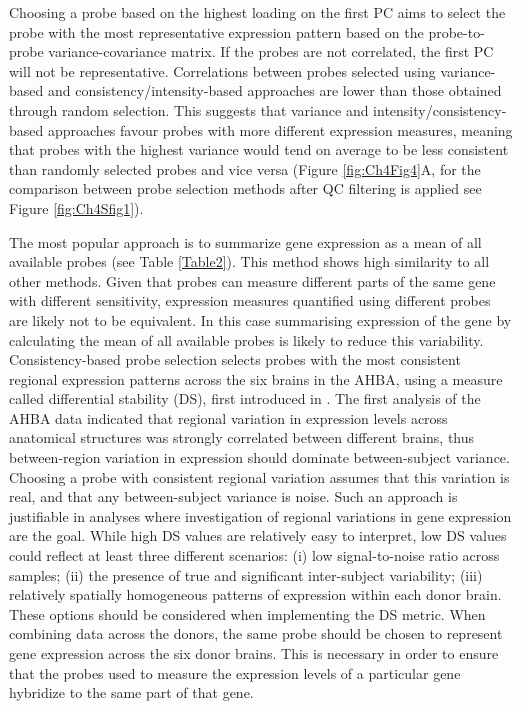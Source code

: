 \documentclass[10pt,A4]{article}
\begin{document}
Choosing a probe based on the highest loading on the first PC aims to select the probe with the most representative expression pattern based on the probe-to-probe variance-covariance matrix. If the probes are not correlated, the first PC will not be representative. Correlations between probes selected using variance-based and consistency/intensity-based approaches are lower than those obtained through random selection. This suggests that variance and intensity/consistency-based approaches favour probes with more different expression measures, meaning that probes with the highest variance would tend on average to be less consistent than randomly selected probes and vice versa (Figure \ref{fig:Ch4Fig4}A, for the comparison between probe selection methods after QC filtering is applied see Figure \ref{fig:Ch4Sfig1}).

The most popular approach is to summarize gene expression as a mean of all available probes (see Table \ref{Table2}). This method shows high similarity to all other methods. Given that probes can measure different parts of the same gene with different sensitivity, expression measures quantified using different probes are likely not to be equivalent. In this case summarising expression of the gene by calculating the mean of all available probes is likely to reduce this variability.
Consistency-based probe selection selects probes with the most consistent regional expression patterns across the six brains in the AHBA, using a measure called differential stability (DS), first introduced in  \citet{Hawrylycz2015}. The first analysis of the AHBA data indicated that regional variation in expression levels across anatomical structures was strongly correlated between different brains, thus between-region variation in expression should dominate between-subject variance. Choosing a probe with consistent regional variation assumes that this variation is real, and that any between-subject variance is noise. Such an approach is justifiable in analyses where investigation of regional variations in gene expression are the goal. While high DS values are relatively easy to interpret, low DS values could reflect at least three different scenarios: (i) low signal-to-noise ratio across samples; (ii) the presence of true and significant inter-subject variability; (iii) relatively spatially homogeneous patterns of expression within each donor brain. These options should be considered when implementing the DS metric.
When combining data across the donors, the same probe should be chosen to represent gene expression across the six donor brains. This is necessary in order to ensure that the probes used to measure the expression levels of a particular gene hybridize to the same part of that gene.
\end{document}
